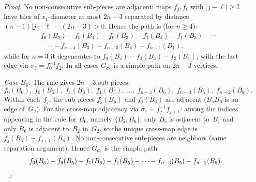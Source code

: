 \documentclass{amsart}
\theoremstyle{definition}
\theoremstyle{remark}
\begin{document}
\begin{proof}
No non-consecutive sub-pieces are adjacent: maps $f_j, f_\ell$ with
$|j - \ell| \ge 2$ have tiles of $x_1$-diameter at most $2n{-}3$
separated by distance $(n{-}1)|j - \ell| - (2n{-}3) > 0$.
Hence the path is (for $n \ge 4$):
\begin{align*}
  &f_0(B_2) - f_0(B_4) - f_0(B_3) - f_1(B_4) - f_1(B_3) - \cdots\\
  &\quad\cdots - f_{n-4}(B_3) - f_{n-3}(B_4) - f_{n-1}(B_1),
\end{align*}
while for $n = 3$ it degenerates to
$f_0(B_2) - f_0(B_4) - f_2(B_1)$, with the last edge via
$\sigma_3 = f_0^{-1} f_2$.
In all cases $G_{\sigma_5}$ is a simple path on $2n{-}3$ vertices.

\emph{Case $B_6$.}
The rule gives $2n{-}3$ sub-pieces:
\[
  f_0(B_6),\; f_0(B_5),\; f_1(B_6),\; f_1(B_5),\;
  \ldots,\; f_{n-3}(B_6),\; f_{n-3}(B_5),\; f_{n-2}(B_6).
\]
Within each~$f_j$, the sub-pieces $f_j(B_5)$ and $f_j(B_6)$ are
adjacent ($B_5 B_6$ is an edge of~$G_2$).
For the cross-map adjacency via $\sigma_1 = f_j^{-1}f_{j+1}$:
among the indices appearing in the rule for $B_6$, namely
$\{B_5, B_6\}$, only $B_5$ is adjacent to~$B_1$ and only
$B_6$ is adjacent to~$B_2$ in~$G_2$, so the unique cross-map edge
is $f_j(B_5) - f_{j+1}(B_6)$.
No non-consecutive sub-pieces are neighbors (same separation argument).
Hence $G_{\sigma_6}$ is the simple path
\[
  f_0(B_6) - f_0(B_5) - f_1(B_6) - f_1(B_5) - \cdots
  - f_{n-3}(B_5) - f_{n-2}(B_6).
  \qedhere
\]
\end{proof}
\end{document}
